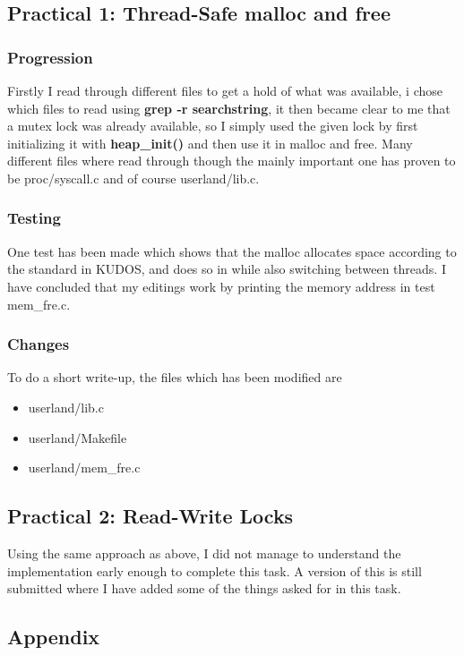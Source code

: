 \documentclass[11pt,a4paper]{article}
\theoremstyle{plain}
\theoremstyle{definition}
\theoremstyle{remark}
\numberwithin{equation}{section}
\begin{document}
\begin{lstlisting}[caption={Buddy Allocation},label={lst:mlfq}]

\end{lstlisting}


\subsection*{Practical 1: Thread-Safe malloc and free}

\subsubsection*{Progression}

Firstly I read through different files to get a hold of what was available, i chose which files to read using \textbf{grep -r searchstring}, it then became clear to me that a mutex lock was already available, so I simply used the given lock by first initializing it with \textbf{heap\_init()} and then use it in malloc and free. Many different files where read through though the mainly important one has proven to be proc/syscall.c and of course userland/lib.c.

\subsubsection*{Testing}

One test has been made which shows that the malloc allocates space according to the standard in KUDOS, and does so in while also switching between threads. I have concluded that my editings work by printing the memory address in test mem\_fre.c.

\subsubsection*{Changes}

To do a short write-up, the files which has been modified are
\begin{itemize}
    \item userland/lib.c
    \item userland/Makefile
    \item userland/mem\_fre.c
\end{itemize}

\subsection*{Practical 2: Read-Write Locks}

Using the same approach as above, I did not manage to understand the implementation early enough to complete this task. A version of this is still submitted where I have added some of the things asked for in this task.


\subsection*{Appendix}



%
%
\end{document}
